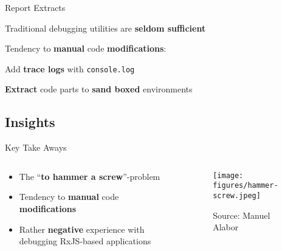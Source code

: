 \documentclass[aspectratio=169]{beamer}
\begin{document}
\begin{frame}[fragile]{Report Extracts}
	\begin{vfilleditems}
		\item Traditional debugging utilities are \textbf{seldom sufficient}
		\item Tendency to \textbf{manual} code \textbf{modifications}:
		\begin{vfilleditems}
		    \item Add \textbf{trace logs} with \texttt{console.log}
		    \item \textbf{Extract} code parts to \textbf{sand boxed} environments
		\end{vfilleditems}
	\end{vfilleditems}
\end{frame}


\subsection{Insights}

\begin{frame}[fragile]{Key Take Aways}
    \begin{columns}[T]
        \begin{column}{.6\linewidth}
            \vspace{3em}
            \begin{itemize}
                \item The ``\textbf{to hammer a screw}''-problem\bigskip
                \item Tendency to \textbf{manual} code \textbf{modifications}\bigskip
                \item Rather \textbf{negative} experience with debugging RxJS-based applications
	        \end{itemize}
        \end{column}
        \begin{column}{.4\linewidth}
            \begin{figure}
                \centering
                \texttt{[image: figures/hammer-screw.jpeg]}
                \caption{\tiny{Source: Manuel Alabor}}
            \end{figure}
        \end{column}
    \end{columns}
\end{frame}
\end{document}
